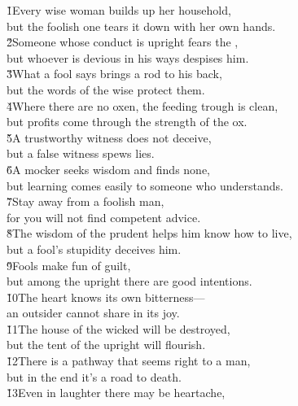 \begin{poetry}
\poeml {}
\v{1}Every wise woman builds up her household, \\
\poeml but the foolish one tears it down with her own hands. \\
\poeml \v{2}Someone whose conduct is upright fears the , \\
\poemll    but whoever is devious in his ways despises him. \\
\poeml \v{3}What a fool says brings a rod to his back, \\
\poemll    but the words of the wise protect them. \\
\poeml \v{4}Where there are no oxen, the feeding trough is clean, \\
\poemll    but profits come through the strength of the ox. \\
\poeml \v{5}A trustworthy witness does not deceive, \\
\poemll    but a false witness spews lies. \\
\poeml \v{6}A mocker seeks wisdom and finds none, \\
\poemll    but learning comes easily to someone who understands. \\
\poeml \v{7}Stay away from a foolish man, \\
\poemll    for you will not find competent advice. \\
\poeml \v{8}The wisdom of the prudent helps him know how to live, \\
\poemll    but a fool's stupidity deceives him. \\
\poeml \v{9}Fools make fun of guilt, \\
\poemll    but among the upright there are good intentions. \\
\poeml \v{10}The heart knows its own bitterness--- \\
\poemll    an outsider cannot share in its joy. \\
\poeml \v{11}The house of the wicked will be destroyed, \\
\poemll    but the tent of the upright will flourish. \\
\poeml \v{12}There is a pathway that seems right to a man, \\
\poemll    but in the end it's a road to death. \\
\poeml \v{13}Even in laughter there may be heartache, \\

\end{poetry}

